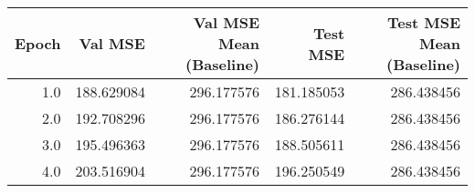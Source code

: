 \begin{tabular}{rrrrr}
\toprule
 Epoch &    Val MSE &  Val MSE Mean (Baseline) &   Test MSE &  Test MSE Mean (Baseline) \\
\midrule
   1.0 & 188.629084 &               296.177576 & 181.185053 &                286.438456 \\
   2.0 & 192.708296 &               296.177576 & 186.276144 &                286.438456 \\
   3.0 & 195.496363 &               296.177576 & 188.505611 &                286.438456 \\
   4.0 & 203.516904 &               296.177576 & 196.250549 &                286.438456 \\
\bottomrule
\end{tabular}
